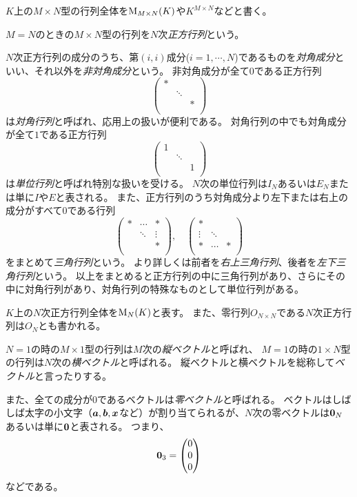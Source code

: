 $K$上の$M\times N$型の行列全体を$\mathrm{M}_{M\times N}(K)$や$K^{M\times N}$などと書く。

$M = N$のときの$M\times N$型の行列を$N$次\emph{正方行列}という。

$N$次正方行列の成分のうち、第$(i, i)$成分($i = 1, \cdots, N$)であるものを\emph{対角成分}といい、それ以外を\emph{非対角成分}という。
非対角成分が全て$0$である正方行列
$$
\begin{pmatrix}
* &        &  \\
  & \ddots &  \\
  &        & *\\
\end{pmatrix}
$$
は\emph{対角行列}と呼ばれ、応用上の扱いが便利である。
対角行列の中でも対角成分が全て$1$である正方行列
$$
\begin{pmatrix}
1 &        &  \\
  & \ddots &  \\
  &        & 1\\
\end{pmatrix}
$$
は\emph{単位行列}と呼ばれ特別な扱いを受ける。
$N$次の単位行列は$I_N$あるいは$E_N$または単に$I$や$E$と表される。
また、正方行列のうち対角成分より左下または右上の成分がすべて$0$である行列
$$
\begin{pmatrix}
* & \cdots & *\\
  & \ddots & \vdots\\
  &        & *\\
\end{pmatrix},
\quad
\begin{pmatrix}
* &        &  \\
\vdots & \ddots &  \\
* & \cdots & *\\
\end{pmatrix}
$$
をまとめて\emph{三角行列}という。
より詳しくは前者を\emph{右上三角行列}、後者を\emph{左下三角行列}という。
以上をまとめると正方行列の中に三角行列があり、さらにその中に対角行列があり、対角行列の特殊なものとして単位行列がある。

$K$上の$N$次正方行列全体を$\mathrm{M}_N(K)$と表す。
また、零行列$O_{N\times N}$である$N$次正方行列は$O_N$とも書かれる。

$N = 1$の時の$M\times 1$型の行列は$M$次の\emph{縦ベクトル}と呼ばれ、
$M = 1$の時の$1\times N$型の行列は$N$次の\emph{横ベクトル}と呼ばれる。
縦ベクトルと横ベクトルを総称して\emph{ベクトル}と言ったりする。

また、全ての成分が$0$であるベクトルは\emph{零ベクトル}と呼ばれる。
ベクトルはしばしば太字の小文字（$\vb*{a}, \vb*{b}, \vb*{x}$など）が割り当てられるが、$N$次の零ベクトルは$\vb*{0}_N$あるいは単に$\vb*{0}$と表される。
つまり、
$$
\vb*{0}_3 = \begin{pmatrix}0 \\ 0 \\ 0\end{pmatrix}
$$
などである。


